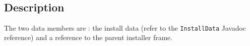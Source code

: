 \begin{center}
\end{center}\

\subsection{Description}

The two data members are : the install data (refer to the \texttt{InstallData}
Javadoc reference) and a reference to the parent installer frame.\\

